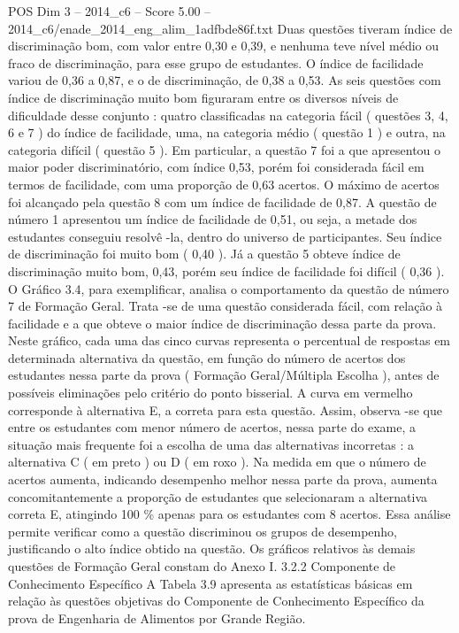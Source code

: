 \begin{textsample}{POS Dim 3 – 2014\_c6 – Score 5.00 – 2014\_c6/enade\_2014\_eng\_alim\_1adfbde86f.txt}
Duas questões tiveram índice de discriminação bom, com valor entre 0,30 e 0,39, e nenhuma teve nível médio ou fraco de discriminação, para esse grupo de estudantes.
O índice de facilidade variou de 0,36 a 0,87, e o de discriminação, de 0,38 a 0,53.
As seis questões com índice de discriminação muito bom figuraram entre os diversos níveis de dificuldade desse conjunto : quatro classificadas na categoria fácil ( questões 3, 4, 6 e 7 ) do índice de facilidade, uma, na categoria médio ( questão 1 ) e outra, na categoria difícil ( questão 5 ).
Em particular, a questão 7 foi a que apresentou o maior poder discriminatório, com índice 0,53, porém foi considerada fácil em termos de facilidade, com uma proporção de 0,63 acertos.
O máximo de acertos foi alcançado pela questão 8 com um índice de facilidade de 0,87.
A questão de número 1 apresentou um índice de facilidade de 0,51, ou seja, a metade dos estudantes conseguiu resolvê -la, dentro do universo de participantes.
Seu índice de discriminação foi muito bom ( 0,40 ).
Já a questão 5 obteve índice de discriminação muito bom, 0,43, porém seu índice de facilidade foi difícil ( 0,36 ).
O Gráfico 3.4, para exemplificar, analisa o comportamento da questão de número 7 de Formação Geral.
Trata -se de uma questão considerada fácil, com relação à facilidade e a que obteve o maior índice de discriminação dessa parte da prova.
Neste gráfico, cada uma das cinco curvas representa o percentual de respostas em determinada alternativa da questão, em função do número de acertos dos estudantes nessa parte da prova ( Formação Geral/Múltipla Escolha ), antes de possíveis eliminações pelo critério do ponto bisserial.
A curva em vermelho corresponde à alternativa E, a correta para esta questão.
Assim, observa -se que entre os estudantes com menor número de acertos, nessa parte do exame, a situação mais frequente foi a escolha de uma das alternativas incorretas : a alternativa C ( em preto ) ou D ( em roxo ).
Na medida em que o número de acertos aumenta, indicando desempenho melhor nessa parte da prova, aumenta concomitantemente a proporção de estudantes que selecionaram a alternativa correta E, atingindo 100 \% apenas para os estudantes com 8 acertos.
Essa análise permite verificar como a questão discriminou os grupos de desempenho, justificando o alto índice obtido na questão.
Os gráficos relativos às demais questões de Formação Geral constam do Anexo I. 3.2.2 Componente de Conhecimento Específico A Tabela 3.9 apresenta as estatísticas básicas em relação às questões objetivas do Componente de Conhecimento Específico da prova de Engenharia de Alimentos por Grande Região.

\end{textsample}

